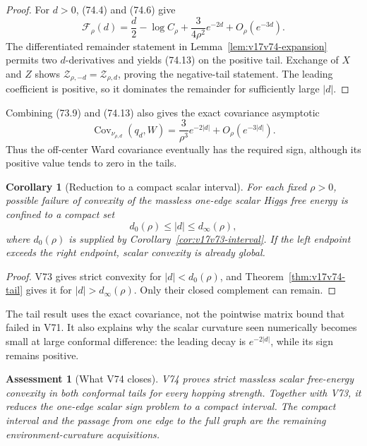 \documentclass[11pt]{article}
\newtheorem{corollary}[theorem]{Corollary}
\newtheorem{assessment}[theorem]{Assessment}
\theoremstyle{remark}
\begin{document}
\begin{proof}
For \(d>0\), (74.4) and (74.6) give
\[
 \mathcal F_\rho(d)
 =\frac d2-\log C_\rho
 +\frac{3}{4\rho^2}e^{-2d}+O_\rho(e^{-3d}).       \tag{74.15}
\]
The differentiated remainder statement in
Lemma~\ref{lem:v17v74-expansion} permits two \(d\)-derivatives and
yields (74.13) on the positive tail.  Exchange of \(X\) and \(Z\)
shows \(\mathcal Z_{\rho,-d}=\mathcal Z_{\rho,d}\), proving the
negative-tail statement.  The leading coefficient is positive, so it
dominates the remainder for sufficiently large \(|d|\).
\end{proof}

Combining (73.9) and (74.13) also gives the exact covariance asymptotic
\[
 \operatorname{Cov}_{\nu_{\rho,d}}(q_d,W)
 =\frac{3}{\rho^3}e^{-2|d|}
 +O_\rho(e^{-3|d|}).                              \tag{74.16}
\]
Thus the off-center Ward covariance eventually has the required sign,
although its positive value tends to zero in the tails.

\begin{corollary}[Reduction to a compact scalar interval]
\label{cor:v17v74-compact}
For each fixed \(\rho>0\), possible failure of convexity of the
massless one-edge scalar Higgs free energy is confined to a compact
set
\[
 d_0(\rho)\leq|d|\leq d_\infty(\rho),             \tag{74.17}
\]
where \(d_0(\rho)\) is supplied by
Corollary~\ref{cor:v17v73-interval}.  If the left endpoint exceeds the
right endpoint, scalar convexity is already global.
\end{corollary}

\begin{proof}
V73 gives strict convexity for \(|d|<d_0(\rho)\), and
Theorem~\ref{thm:v17v74-tail} gives it for
\(|d|>d_\infty(\rho)\).  Only their closed complement can remain.
\end{proof}

The tail result uses the exact covariance, not the pointwise matrix
bound that failed in V71.  It also explains why the scalar curvature
seen numerically becomes small at large conformal difference: the
leading decay is \(e^{-2|d|}\), while its sign remains positive.

\begin{assessment}[What V74 closes]
\label{ass:v17v74-status}
V74 proves strict massless scalar free-energy convexity in both
conformal tails for every hopping strength.  Together with V73, it
reduces the one-edge scalar sign problem to a compact interval.  The
compact interval and the passage from one edge to the full graph are
the remaining environment-curvature acquisitions.
\end{assessment}
\end{document}
